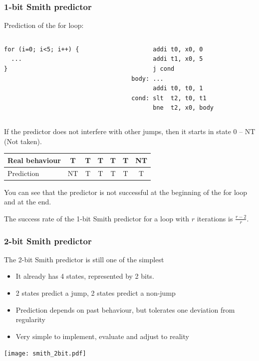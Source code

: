 \documentclass{beamer}
\begin{document}
\begin{frame}[fragile]
\frametitle{1-bit Smith predictor}

Prediction of the for loop:

\begin{columns}[T]
\begin{column}{0.35\textwidth}
\begin{verbatim}
for (i=0; i<5; i++) {
  ...
}
\end{verbatim}
\end{column}
\hfill
\begin{column}{0.45\textwidth}
\begin{verbatim}
      addi t0, x0, 0
      addi t1, x0, 5
      j cond
body: ...
      addi t0, t0, 1
cond: slt  t2, t0, t1
      bne  t2, x0, body
\end{verbatim}
\end{column}
\end{columns}
\bigskip
If the predictor does not interfere with other jumps, then it starts in state 0 -- NT (Not taken).

\begin{tabular}{|l|c|c|c|c|c|c|}\hline
Real behaviour & T & T & T & T & T & NT\\\hline
Prediction & {\color{red}NT} & T & T & T & T & {\color{red}T}\\\hline
\end{tabular}

You can see that the predictor is not successful at the beginning of the for loop and at the end.

The success rate of the 1-bit Smith predictor for a loop with $r$ iterations is $\frac{r-2}{r}$.
\end{frame}


\begin{frame}
\frametitle{2-bit Smith predictor}

The 2-bit Smith predictor is still one of the simplest
\begin{itemize}
\item It already has 4 states, represented by 2 bits.
\item 2 states predict a jump, 2 states predict a non-jump
\item Prediction depends on past behaviour, but tolerates one deviation from regularity
\item Very simple to implement, evaluate and adjust to reality
\end{itemize}

\begin{center}
\texttt{[image: smith\_2bit.pdf]}
\end{center}
\end{frame}
\end{document}
